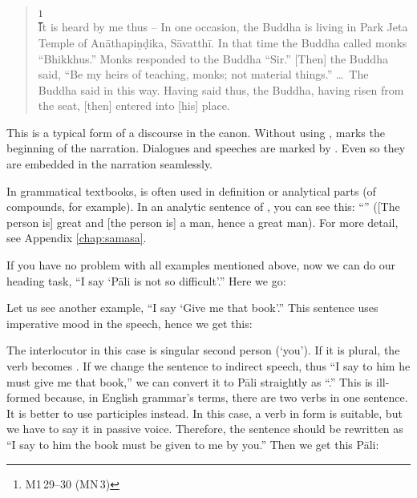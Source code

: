 \begin{quote}
\footnote{M1\,29--30 (MN\,3)}\\[1.5mm]
{It is heard by me thus -- In one occasion, the Buddha is living in Park Jeta Temple of An\=athapi\d n\d dika, S\=avatth\=i. In that time the Buddha called monks ``Bhik\-khus.'' Monks responded to the Buddha ``Sir.'' [Then] the Buddha said, ``Be my heirs of teaching, monks; not material things.'' \ldots\ The Buddha said in this way. Having said thus, the Buddha, having risen from the seat, [then] entered into [his] place.}
\end{quote}

This is a typical form of a discourse in the canon. Without using ,  marks the beginning of the narration. Dialogues and speeches are marked by . Even so they are embedded in the narration seamlessly.

In grammatical textbooks,  is often used in definition or analytical parts (of compounds, for example). In an analytic sentence of , you can see this: ``'' ([The person is] great and [the person is] a man, hence a great man). For more detail, see Appendix \ref{chap:samasa}.

If you have no problem with all examples mentioned above, now we can do our heading task, ``I say `P\=ali is not so difficult'.'' Here we go:


Let us see another example, ``I say `Give me that book'.'' This sentence uses imperative mood in the speech, hence we get this:


The interlocutor in this case is singular second person (`you'). If it is plural, the verb becomes . If we change the sentence to indirect speech, thus ``I say to him he must give me that book,'' we can convert it to P\=ali straightly as ``.'' This is ill-formed because, in English grammar's terms, there are two verbs in one sentence. It is better to use participles instead. In this case, a verb in  form is suitable, but we have to say it in passive voice. Therefore, the sentence should be rewritten as ``I say to him the book must be given to me by you.'' Then we get this P\=ali:

